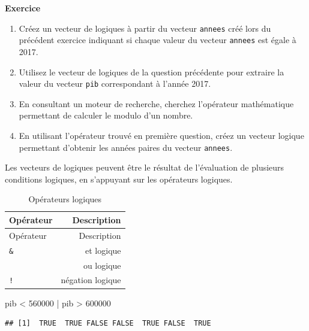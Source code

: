 \documentclass[
  11pt,
]{book}
\newenvironment{Shaded}{\begin{snugshade}}{\end{snugshade}}
\newcommand{\DecValTok}[1]{\textcolor[rgb]{0.00,0.00,0.81}{#1}}
\newcommand{\NormalTok}[1]{#1}
\newcommand{\SpecialCharTok}[1]{\textcolor[rgb]{0.00,0.00,0.00}{#1}}
\providecommand{\tightlist}{%
  \setlength{\itemsep}{0pt}\setlength{\parskip}{0pt}}
\numberwithin{equation}{section}
\numberwithin{countremarque}{section}
\newenvironment{greenbox}{
  \begin{tcolorbox}[breakable, colback=vert,coltext=black,
                  colframe=grisfonce]}
 {\end{tcolorbox}}
\begin{document}
\begin{greenbox}

\textbf{Exercice}

\begin{enumerate}
\def\labelenumi{\arabic{enumi}.}
\tightlist
\item
  Créez un vecteur de logiques à partir du vecteur \texttt{annees} créé lors du précédent exercice indiquant si chaque valeur du vecteur \texttt{annees} est égale à 2017.
\item
  Utilisez le vecteur de logiques de la question précédente pour extraire la valeur du vecteur \texttt{pib} correspondant à l'année 2017.
\item
  En consultant un moteur de recherche, cherchez l'opérateur mathématique permettant de calculer le modulo d'un nombre.
\item
  En utilisant l'opérateur trouvé en première question, créez un vecteur logique permettant d'obtenir les années paires du vecteur \texttt{annees}.
\end{enumerate}

\end{greenbox}

Les vecteurs de logiques peuvent être le résultat de l'évaluation de plusieurs conditions logiques, en s'appuyant sur les opérateurs logiques.

\begin{longtable}[]{@{}lr@{}}
\caption{\label{tab:operateurs-logiques} Opérateurs logiques}\tabularnewline
\toprule
Opérateur & Description \\
\midrule
\endfirsthead
\toprule
Opérateur & Description \\
\midrule
\endhead
\texttt{\&} & et logique \\
\texttt{\textbar{}} & ou logique \\
\texttt{!} & négation logique \\
\bottomrule
\end{longtable}

\begin{Shaded}
\begin{Highlighting}[]
\NormalTok{pib }\SpecialCharTok{\textless{}} \DecValTok{560000} \SpecialCharTok{|}\NormalTok{ pib }\SpecialCharTok{\textgreater{}} \DecValTok{600000}
\end{Highlighting}
\end{Shaded}

\begin{lstlisting}
## [1]  TRUE  TRUE FALSE FALSE  TRUE FALSE  TRUE
\end{lstlisting}
\end{document}
